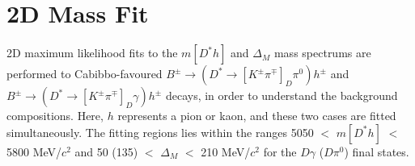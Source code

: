 \documentclass[oneside,12pt]{article}
\begin{document}
{\begin{landscape}
\begin{table}[]
\centering
{}
\caption{\small{Variables used in the training of the second stage BDT, ranked
by importance. $\gamma^{1}$ and $\gamma^{2}$ refer to the two daughter photons of the
$\pi^0$.}}
\label{table:bdt2TrainingVar}
\end{table}
\end{landscape}
}

\section{2D Mass Fit} \label{massfit}

2D maximum likelihood fits to the $m[D^*h]$ and $\Delta_M$ mass spectrums are
performed to Cabibbo-favoured $B^{\pm}\rightarrow (D^*\rightarrow
[K^{\pm}\pi^{\mp}]_D\pi^0)h^{\pm}$ and $B^{\pm}\rightarrow (D^*\rightarrow
[K^{\pm}\pi^{\mp}]_D\gamma)h^{\pm}$ decays, in order to understand the
background compositions. Here, $h$ represents a pion or kaon, and these two
cases are fitted simultaneously. The fitting regions lies within the ranges 5050
$<$ $m[D^*h]$ $<$ 5800 MeV/$c^2$ and 50 (135) $<$ $\Delta_M$ $<$ 210 MeV/$c^2$
for the $D\gamma$ ($D\pi^0$) final states.
\end{document}
